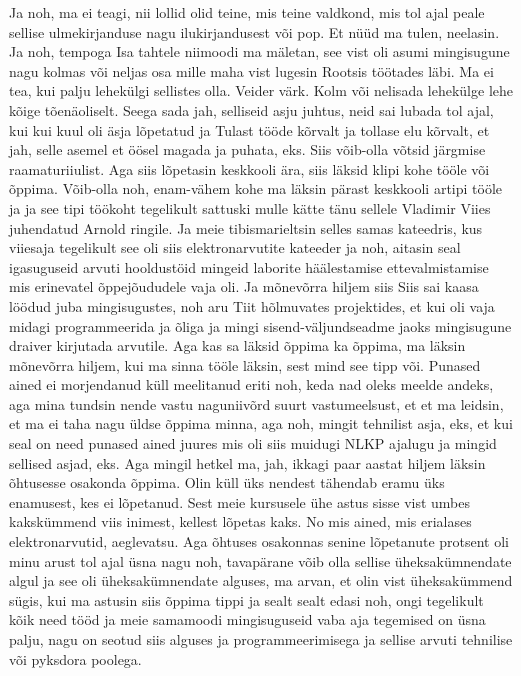 Ja noh, ma ei teagi, nii lollid olid teine, mis teine valdkond, mis tol ajal peale sellise ulmekirjanduse nagu ilukirjandusest või pop. Et nüüd ma tulen, neelasin. Ja noh, tempoga Isa tahtele niimoodi ma mäletan, see vist oli asumi mingisugune nagu kolmas või neljas osa mille maha vist lugesin Rootsis töötades läbi. Ma ei tea, kui palju lehekülgi sellistes olla. Veider värk. Kolm või nelisada lehekülge lehe kõige tõenäoliselt. Seega sada jah, selliseid asju juhtus, neid sai lubada tol ajal, kui kui kuul oli äsja lõpetatud ja Tulast tööde kõrvalt ja tollase elu kõrvalt, et jah, selle asemel et öösel magada ja puhata, eks. Siis võib-olla võtsid järgmise raamaturiiulist.
Aga siis lõpetasin keskkooli ära, siis läksid klipi kohe tööle või õppima.
Võib-olla noh, enam-vähem kohe ma läksin pärast keskkooli artipi tööle ja ja see tipi töökoht tegelikult sattuski mulle kätte tänu sellele Vladimir Viies juhendatud Arnold ringile. Ja meie tibismarieltsin selles samas kateedris, kus viiesaja tegelikult see oli siis elektronarvutite kateeder ja noh, aitasin seal igasuguseid arvuti hooldustöid mingeid laborite häälestamise ettevalmistamise mis erinevatel õppejõududele vaja oli. Ja mõnevõrra hiljem siis
Siis sai kaasa löödud juba mingisugustes, noh aru Tiit hõlmuvates projektides, et kui oli vaja midagi programmeerida ja õliga ja mingi sisend-väljundseadme jaoks mingisugune draiver kirjutada arvutile. Aga kas sa läksid õppima ka õppima, ma läksin mõnevõrra hiljem, kui ma sinna tööle läksin, sest mind see tipp või.
Punased ained ei morjendanud küll meelitanud eriti noh, keda nad oleks meelde andeks, aga mina tundsin nende vastu naguniivõrd suurt vastumeelsust, et et ma leidsin, et ma ei taha nagu üldse õppima minna, aga noh, mingit tehnilist asja, eks, et kui seal on need punased ained juures mis oli siis muidugi NLKP ajalugu ja mingid sellised asjad, eks. Aga mingil hetkel ma, jah, ikkagi paar aastat hiljem läksin õhtusesse osakonda õppima. Olin küll üks nendest tähendab eramu üks enamusest, kes ei lõpetanud. Sest meie kursusele ühe astus sisse vist umbes kakskümmend viis inimest, kellest lõpetas kaks. No mis ained, mis erialases elektronarvutid, aeglevatsu. Aga õhtuses osakonnas senine lõpetanute protsent oli minu arust tol ajal üsna nagu noh, tavapärane võib olla sellise üheksakümnendate algul ja see oli üheksakümnendate alguses, ma arvan, et olin vist üheksakümmend sügis, kui ma astusin siis õppima tippi ja sealt sealt edasi noh, ongi tegelikult kõik need tööd ja meie samamoodi mingisuguseid vaba aja tegemised on üsna palju, nagu on seotud siis alguses ja programmeerimisega ja sellise arvuti tehnilise või pyksdora poolega.
